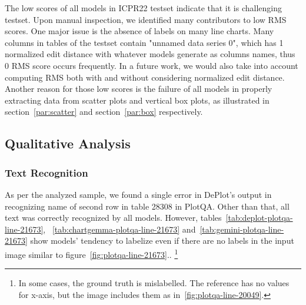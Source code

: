 \documentclass[
	letterpaper, %
]{jdf}
\begin{document}
The low scores of all models in ICPR22 testset indicate that it is challenging testset.
Upon manual inspection, we identified many contributors to low RMS scores.
One major issue is the absence of labels on many line charts.
Many columns in tables of the testset contain "unnamed data series 0", which has 1 normalized edit distance with whatever models generate as columns names, thus 0 RMS score occurs frequently.
In a future work, we would also take into account computing RMS both with and without considering normalized edit distance.
Another reason for those low scores is the failure of all models in properly extracting data from scatter plots and vertical box plots, as illustrated in section~\ref{par:scatter} and section~\ref{par:box} respectively.

\subsection{Qualitative Analysis}\label{ssect:qualitative}
\subsubsection{Text Recognition}\label{ssect:qualitative-text-recognition}
As per the analyzed sample, we found a single error in DePlot's output in  recognizing name of second row in table 28308 in PlotQA.
Other than that, all text was correctly recognized by all models.
However, tables~\ref{tab:deplot-plotqa-line-21673}, ~\ref{tab:chartgemma-plotqa-line-21673} and~\ref{tab:gemini-plotqa-line-21673} show models' tendency to labelize even if there are no labels in the input image similar to figure~\ref{fig:plotqa-line-21673}..
\footnote{In some cases, the ground truth is mislabelled. The reference has no values for x-axis, but the image includes them as in~\ref{fig:plotqa-line-20049}.}
\end{document}
